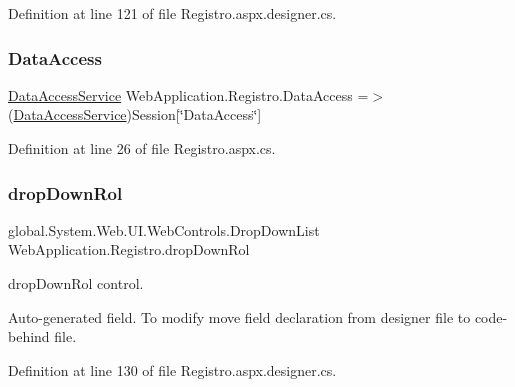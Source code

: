 Definition at line 121 of file Registro.\+aspx.\+designer.\+cs.

\mbox{\label{classWebApplication_1_1Registro_ae06e320e4cdfb04c4f2cdf542f13ef86}} 
\subsubsection{\texorpdfstring{DataAccess}{DataAccess}}
{\footnotesize\ttfamily \mbox{\hyperlink{classDataBaseAccess_1_1DataAccessService}{Data\+Access\+Service}} Web\+Application.\+Registro.\+Data\+Access =$>$ (\mbox{\hyperlink{classDataBaseAccess_1_1DataAccessService}{Data\+Access\+Service}})Session\mbox{[}\char`\"{}Data\+Access\char`\"{}\mbox{]}\hspace{0.3cm}{\ttfamily [private]}}



Definition at line 26 of file Registro.\+aspx.\+cs.

\mbox{\label{classWebApplication_1_1Registro_a225d72ba4515f5fd01dc179e37ab2917}} 
\subsubsection{\texorpdfstring{dropDownRol}{dropDownRol}}
{\footnotesize\ttfamily global.\+System.\+Web.\+U\+I.\+Web\+Controls.\+Drop\+Down\+List Web\+Application.\+Registro.\+drop\+Down\+Rol\hspace{0.3cm}{\ttfamily [protected]}}



drop\+Down\+Rol control. 

Auto-\/generated field. To modify move field declaration from designer file to code-\/behind file. 

Definition at line 130 of file Registro.\+aspx.\+designer.\+cs.

\mbox{\label{classWebApplication_1_1Registro_a171880c89476a5b9fe1ae88f343a6b93}} 
